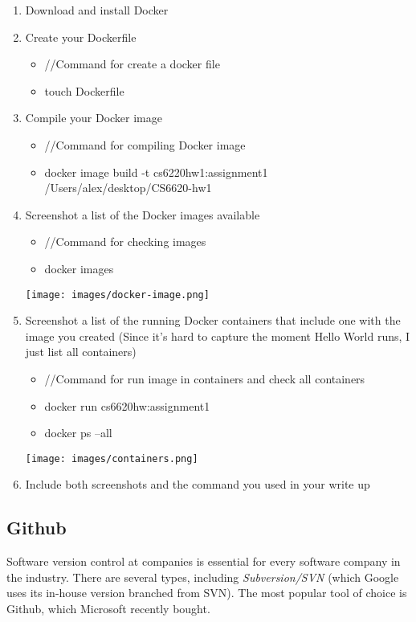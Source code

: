 \documentclass[paper=a4, fontsize=11pt]{scrartcl} %
\begin{document}
\begin{enumerate}
    \item Download and install Docker
    \item Create your Dockerfile
    \begin{itemize}
        \item //Command for create a docker file
        \item touch Dockerfile
    \end{itemize}
    \item Compile your Docker image
    \begin{itemize}
        \item //Command for compiling Docker image
        \item docker image build -t cs6220hw1:assignment1 /Users/alex/desktop/CS6620-hw1
    \end{itemize}
    \item Screenshot a list of the Docker images available
    \begin{itemize}
        \item //Command for checking images
        \item docker images
    \end{itemize}
    \texttt{[image: images/docker-image.png]}
    \item Screenshot a list of the running Docker containers that include one with the image you created (Since it's hard to capture the moment Hello World runs, I just list all containers)
    \begin{itemize}
        \item //Command for run image in containers and check all containers
        \item docker run cs6620hw:assignment1
        \item docker ps --all
    \end{itemize}
    \texttt{[image: images/containers.png]}
    \item Include both screenshots and the command you used in your write up
\end{enumerate}

\subsection{Github}

Software version control at companies is essential for every software company in the industry. There are several types, including \emph{Subversion/SVN} (which Google uses its in-house version branched from SVN). The most popular tool of choice is Github, which Microsoft recently bought. 
\end{document}
